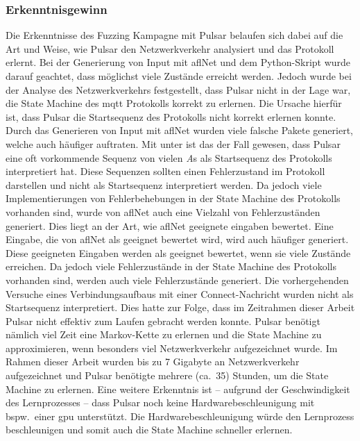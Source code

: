 \subsubsection{Erkenntnisgewinn}
Die Erkenntnisse des Fuzzing Kampagne mit Pulsar belaufen sich dabei auf die Art und Weise, wie Pulsar
den Netzwerkverkehr analysiert und das Protokoll erlernt.
Bei der Generierung von Input mit \gls{afl}Net und dem Python-Skript wurde darauf geachtet, dass möglichst viele Zustände
erreicht werden.
Jedoch wurde bei der Analyse des Netzwerkverkehrs festgestellt, dass Pulsar nicht in der Lage war, die State Machine
des \gls{mqtt} Protokolls korrekt zu erlernen.
Die Ursache hierfür ist, dass Pulsar die Startsequenz des Protokolls nicht korrekt erlernen konnte.
Durch das Generieren von Input mit \gls{afl}Net wurden viele falsche Pakete generiert, welche auch häufiger auftraten.
Mit unter ist das der Fall gewesen, dass Pulsar eine oft vorkommende Sequenz von vielen \textit{A}s als Startsequenz
des Protokolls interpretiert hat.
Diese Sequenzen sollten einen Fehlerzustand im Protokoll darstellen und nicht als Startsequenz interpretiert werden.
Da jedoch viele Implementierungen von Fehlerbehebungen in der State Machine des Protokolls vorhanden sind, wurde von
\gls{afl}Net auch eine Vielzahl von Fehlerzuständen generiert.
Dies liegt an der Art, wie \gls{afl}Net geeignete eingaben bewertet.
Eine Eingabe, die von \gls{afl}Net als geeignet bewertet wird, wird auch häufiger generiert.
Diese geeigneten Eingaben werden als geeignet bewertet, wenn sie viele Zustände erreichen.
Da jedoch viele Fehlerzustände in der State Machine des Protokolls vorhanden sind, werden auch viele Fehlerzustände
generiert.
Die vorhergehenden Versuche eines Verbindungsaufbaus mit einer Connect-Nachricht wurden nicht als Startsequenz
interpretiert.
Dies hatte zur Folge, dass im Zeitrahmen dieser Arbeit Pulsar nicht effektiv zum Laufen gebracht werden konnte.
Pulsar benötigt nämlich viel Zeit eine Markov-Kette zu erlernen und die State Machine zu approximieren, wenn besonders
viel Netzwerkverkehr aufgezeichnet wurde.
Im Rahmen dieser Arbeit wurden bis zu 7 Gigabyte an Netzwerkverkehr aufgezeichnet und Pulsar benötigte mehrere (ca.\ 35)
Stunden, um die State Machine zu erlernen.\newline\newline
Eine weitere Erkenntnis ist -- aufgrund der Geschwindigkeit des Lernprozesses -- dass Pulsar noch keine Hardwarebeschleunigung
mit bspw.\ einer \gls{gpu} unterstützt.
Die Hardwarebeschleunigung würde den Lernprozess beschleunigen und somit auch die State Machine schneller erlernen.
